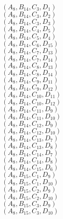 \documentclass[14pt]{article}
\begin{document}
    $({A}_{8}, {B}_{14}, {C}_{3}, {D}_{1}) $ \\ 
    $({A}_{8}, {B}_{14}, {C}_{3}, {D}_{2}) $ \\ 
    $({A}_{8}, {B}_{14}, {C}_{3}, {D}_{3}) $ \\ 
    $({A}_{8}, {B}_{14}, {C}_{4}, {D}_{5}) $ \\ 
    $({A}_{8}, {B}_{14}, {C}_{5}, {D}_{4}) $ \\ 
    $({A}_{8}, {B}_{14}, {C}_{6}, {D}_{15}) $ \\ 
    $({A}_{8}, {B}_{14}, {C}_{7}, {D}_{13}) $ \\ 
    $({A}_{8}, {B}_{14}, {C}_{7}, {D}_{14}) $ \\ 
    $({A}_{8}, {B}_{14}, {C}_{8}, {D}_{13}) $ \\ 
    $({A}_{8}, {B}_{14}, {C}_{8}, {D}_{14}) $ \\ 
    $({A}_{8}, {B}_{14}, {C}_{9}, {D}_{11}) $ \\ 
    $({A}_{8}, {B}_{14}, {C}_{9}, {D}_{12}) $ \\ 
    $({A}_{8}, {B}_{14}, {C}_{10}, {D}_{11}) $ \\ 
    $({A}_{8}, {B}_{14}, {C}_{10}, {D}_{12}) $ \\ 
    $({A}_{8}, {B}_{14}, {C}_{11}, {D}_{9}) $ \\ 
    $({A}_{8}, {B}_{14}, {C}_{11}, {D}_{10}) $ \\ 
    $({A}_{8}, {B}_{14}, {C}_{12}, {D}_{9}) $ \\ 
    $({A}_{8}, {B}_{14}, {C}_{12}, {D}_{10}) $ \\ 
    $({A}_{8}, {B}_{14}, {C}_{13}, {D}_{7}) $ \\ 
    $({A}_{8}, {B}_{14}, {C}_{13}, {D}_{8}) $ \\ 
    $({A}_{8}, {B}_{14}, {C}_{14}, {D}_{7}) $ \\ 
    $({A}_{8}, {B}_{14}, {C}_{14}, {D}_{8}) $ \\ 
    $({A}_{8}, {B}_{14}, {C}_{15}, {D}_{6}) $ \\ 
    $({A}_{8}, {B}_{15}, {C}_{1}, {D}_{9}) $ \\ 
    $({A}_{8}, {B}_{15}, {C}_{1}, {D}_{10}) $ \\ 
    $({A}_{8}, {B}_{15}, {C}_{2}, {D}_{9}) $ \\ 
    $({A}_{8}, {B}_{15}, {C}_{2}, {D}_{10}) $ \\ 
    $({A}_{8}, {B}_{15}, {C}_{3}, {D}_{9}) $ \\ 
    $({A}_{8}, {B}_{15}, {C}_{3}, {D}_{10}) $ \\ 
\end{document}
